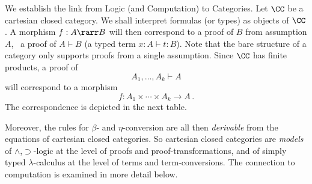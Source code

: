 \documentclass[12pt]{article}
\begin{document}
We establish the link from Logic (and Computation) to Categories. Let $\CC$ be a cartesian closed category. We shall interpret formulas (or types) as
objects of $\CC$. A morphism $f:A\rarr B$ will then correspond to a proof of $B$ from assumption $A$, {\ie}~a proof of $A\vdash B$ (a typed term
$x:A\vdash t:B$).
%
Note that the bare structure of a category only supports proofs from a single assumption. Since $\CC$ has finite products, a proof of
\[ A_1 , \ldots , A_k \vdash A \]
will correspond to a morphism
\[ f : A_1 \times \cdots \times A_k \longrightarrow A\,. \]
%
The correspondence is depicted in the next table.
\begin{center}
\renewcommand{\arraystretch}{0.5}
\end{center}
%
Moreover, the rules for $\beta$- and $\eta$-conversion are all then \emph{derivable} from the equations of cartesian closed categories. So cartesian
closed categories are \emph{models} of $\wedge$,$\supset$-logic at the level of proofs and proof-transformations, and of simply typed
$\lambda$-calculus at the level of terms and term-conversions.
%
The connection to computation is examined in more detail below.
\end{document}
